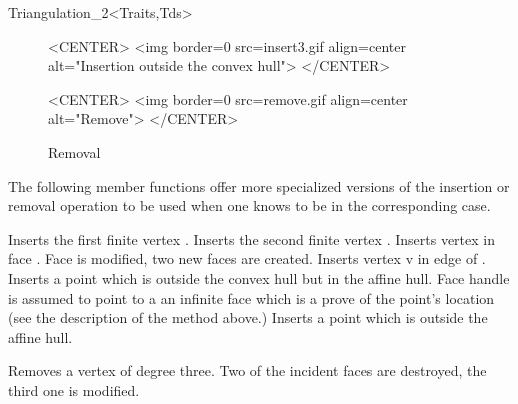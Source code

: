 \begin{ccRefClass}{Triangulation_2<Traits,Tds>}
\begin{figure}
\begin{ccHtmlOnly}
<CENTER>
<img border=0 src=insert3.gif align=center alt="Insertion outside the
convex hull">
</CENTER>
\end{ccHtmlOnly}
\end{figure}

\begin{figure}
\begin{ccTexOnly}
\begin{center}

\end{center}
\end{ccTexOnly}
\caption{Removal
\label{Triangulation_ref_Fig_remove}}

\begin{ccHtmlOnly}
<CENTER>
<img border=0 src=remove.gif align=center alt="Remove">
</CENTER>
\end{ccHtmlOnly}
\end{figure}


The following member functions offer more specialized versions of the
insertion or removal operation to be used when one knows to be in the
corresponding case.

{Inserts the first finite  vertex .}
{Inserts the second finite  vertex .}
 {Inserts vertex  in face
. Face  is modified,
two new faces are created.
}
{Inserts vertex v in edge  of .
}
{Inserts 
 a point which is outside the convex hull  but in the affine hull.
Face handle  is assumed to point to a an infinite face
which is a prove of the point's location (see the description of the
 method above.)
}
{Inserts 
 a point which is outside the affine hull.}

{Removes a vertex of degree three. Two of the incident faces are destroyed,
the third one is modified.
}


\end{ccRefClass}
